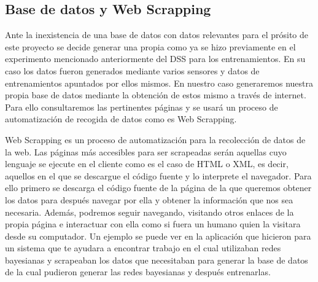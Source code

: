 \subsection{Base de datos y Web Scrapping}
Ante la inexistencia de una base de datos con datos relevantes para el prósito de este proyecto
 se decide generar una propia como ya se hizo previamente en el experimento mencionado anteriormente
 del DSS para los entrenamientos. En su caso los datos fueron generados mediante varios sensores y
 datos de entrenamientos apuntados por ellos mismos. En nuestro caso generaremos nuestra propia
 base de datos mediante la obtención de estos mismo a través de internet. Para ello consultaremos
 las pertinentes páginas y se usará un proceso de automatización de recogida de datos como es
 Web Scrapping.

Web Scrapping es un proceso de automatización para la recolección de datos de la web. Las páginas
 más accesibles para ser scrapeadas serán aquellas cuyo lenguaje se ejecute en el cliente como
 es el caso de HTML o XML, es decir, aquellos en el que se descargue el código fuente y lo interprete
 el navegador. Para ello primero se descarga el código fuente de la página de la que queremos
 obtener los datos para después navegar por ella y obtener la información que nos sea necesaria.
 Además, podremos seguir navegando, visitando otros enlaces de la propia página e interactuar
 con ella como si fuera un humano quien la visitara desde su computador. Un ejemplo se puede
 ver en la aplicación que hicieron para un sistema que te ayudara a encontrar trabajo en el cual
 utilizaban redes bayesianas y scrapeaban los datos que necesitaban para generar la base de datos
 de la cual pudieron generar las redes bayesianas y después entrenarlas.
